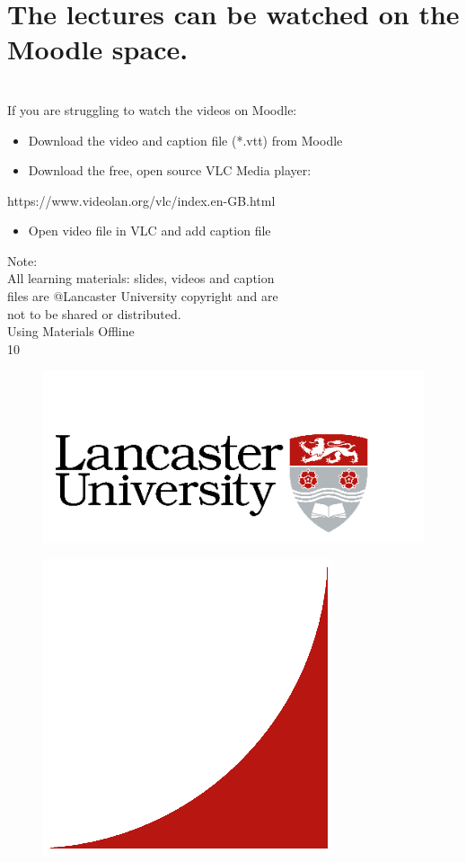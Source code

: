 \documentclass[12pt]{article}
\begin{document}
\section{The lectures can be watched on the Moodle space.}
\\
If you are struggling to watch the videos on Moodle:\\
\begin{itemize}
  \item Download the video and caption file (*.vtt) from Moodle
  \item Download the free, open source VLC Media player: 
\end{itemize}
https://www.videolan.org/vlc/index.en-GB.html\\
\begin{itemize}
  \item Open video file in VLC and add caption file
\end{itemize}
Note:\\
All learning materials: slides, videos and caption\\
files are @Lancaster University copyright and are \\
not to be shared or distributed.\\
Using Materials Offline\\
10\\
\begin{figure}[H]
\includegraphics[width=0.5\linewidth]{page10-image-1.png}
\end{figure}
\begin{figure}[H]
\includegraphics[width=0.5\linewidth]{page10-image-2.png}
\end{figure}
\end{document}
